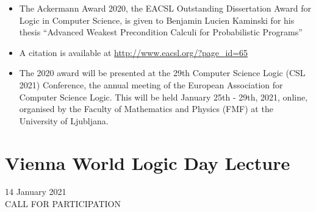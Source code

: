\documentclass{article}
\begin{document}
\begin{itemize}\item  The Ackermann Award 2020, the EACSL Outstanding Dissertation Award for Logic in Computer Science, is given to Benjamin Lucien Kaminski  for his thesis ``Advanced Weakest Precondition Calculi for Probabilistic Programs'' 
 
\item  A citation is available at \href{http://www.eacsl.org/?page_id=65}{http://www.eacsl.org/?page\_id=65} 
 
\item  The 2020 award will be presented at the 29th Computer Science Logic (CSL 2021) Conference, the annual meeting of the European Association for Computer Science Logic. This will be held January 25th - 29th, 2021, online, organised by the Faculty of Mathematics and Physics (FMF) at the University of Ljubljana. 
 
\end{itemize}\section{Vienna World Logic Day Lecture}\label{ViennaWorldLogicDayLecture}  14 January 2021\\ 
CALL FOR PARTICIPATION 
\end{document}
